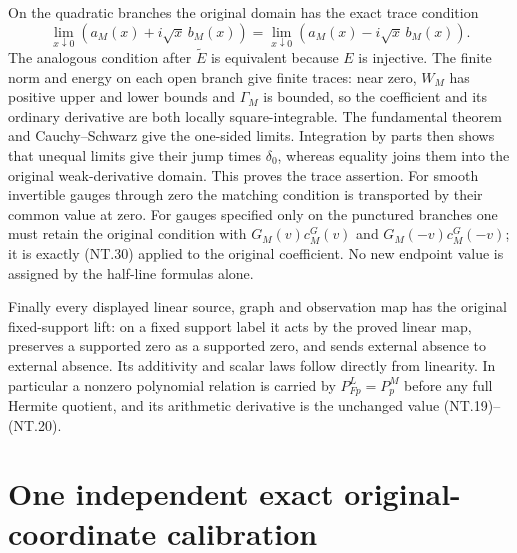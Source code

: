 \documentclass[11pt]{article}
\begin{document}
On the quadratic branches the original domain has the exact trace
condition
\[
 \lim_{x\downarrow0}(a_M(x)+i\sqrt x\,b_M(x))
 =\lim_{x\downarrow0}(a_M(x)-i\sqrt x\,b_M(x)).
 \tag{NT.30}
\]
The analogous condition after $\widetilde E$ is equivalent because
$E$ is injective. The finite norm and energy on each open branch
give finite traces: near zero, $W_M$ has positive upper and lower
bounds and $\Gamma_M$ is bounded, so the coefficient and its
ordinary derivative are both locally square-integrable. The
fundamental theorem and Cauchy--Schwarz give the one-sided limits.
Integration by parts then shows that unequal limits give their
jump times $\delta_0$, whereas equality joins them into the
original weak-derivative domain. This proves the trace assertion.
For smooth invertible gauges through zero the matching condition
is transported by their common value at zero. For gauges specified
only on the punctured branches one must retain the original
condition with $G_M(v)c_M^G(v)$ and $G_M(-v)c_M^G(-v)$;
it is exactly (NT.30) applied to the original coefficient.
No new endpoint value is assigned by the half-line formulas alone.

Finally every displayed linear source, graph and observation map
has the original fixed-support lift: on a fixed support label it
acts by the proved linear map, preserves a supported zero as a
supported zero, and sends external absence to external absence.
Its additivity and scalar laws follow directly from linearity.
In particular a nonzero polynomial relation is carried by
$P^L_{Fp}=P^M_p$ before any full Hermite quotient, and its
arithmetic derivative is the unchanged value (NT.19)--(NT.20).

\section{One independent exact original-coordinate calibration}
\end{document}
